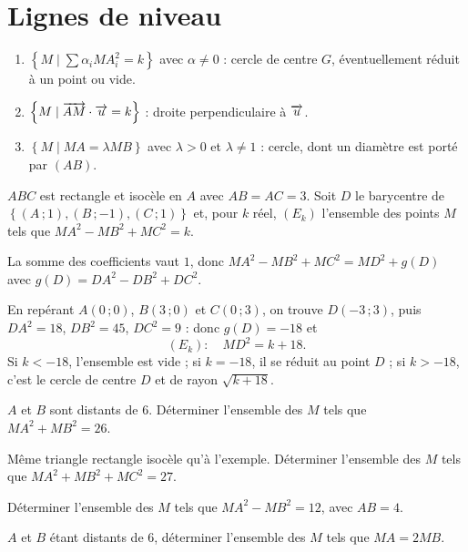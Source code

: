\section{Lignes de niveau}

\begin{propriete}
\begin{enumerate}[label=\textbf{\arabic*.}, leftmargin=*, itemsep=0.15em]
  \item $\left\{M \mid \sum \alpha_{i}MA_{i}^{2} = k\right\}$ avec
        $\alpha \neq 0$ : cercle de centre $G$, éventuellement réduit à un
        point ou vide.
  \item $\left\{M \mid \overrightarrow{AM} \cdot \overrightarrow{u} = k\right\}$ : droite
        perpendiculaire à $\overrightarrow{u}$.
  \item $\left\{M \mid MA = \lambda MB\right\}$ avec $\lambda>0$ et
        $\lambda \neq 1$ : cercle, dont un diamètre est porté par $(AB)$.
\end{enumerate}
\end{propriete}

\begin{exemple}
$ABC$ est rectangle et isocèle en $A$ avec $AB = AC = 3$. Soit $D$ le
barycentre de $\left\{(A\,;1),(B\,;-1),(C\,;1)\right\}$ et, pour $k$ réel,
$(E_{k})$ l'ensemble des points $M$ tels que
$MA^{2}-MB^{2}+MC^{2} = k$.

La somme des coefficients vaut $1$, donc
$MA^{2}-MB^{2}+MC^{2} = MD^{2}+g(D)$ avec
$g(D) = DA^{2}-DB^{2}+DC^{2}$.

En repérant $A(0\,;0)$, $B(3\,;0)$ et $C(0\,;3)$, on trouve $D(-3\,;3)$, puis
$DA^{2} = 18$, $DB^{2} = 45$, $DC^{2} = 9$ : donc $g(D) = -18$ et
\[
  (E_{k}) : \quad MD^{2} = k+18 .
\]
Si $k<-18$, l'ensemble est vide ; si $k = -18$, il se réduit au point $D$ ;
si $k>-18$, c'est le cercle de centre $D$ et de rayon $\sqrt{k+18}$.
\end{exemple}

\begin{entrainement}
\exo[\niveau{1}] $A$ et $B$ sont distants de $6$. Déterminer l'ensemble des
$M$ tels que $MA^{2}+MB^{2} = 26$.

\exo[\niveau{2}] Même triangle rectangle isocèle qu'à l'exemple. Déterminer
l'ensemble des $M$ tels que $MA^{2}+MB^{2}+MC^{2} = 27$.

\exo[\niveau{2}] Déterminer l'ensemble des $M$ tels que
$MA^{2}-MB^{2} = 12$, avec $AB = 4$.

\exo[\niveau{3}] $A$ et $B$ étant distants de $6$, déterminer l'ensemble des
$M$ tels que $MA = 2MB$.
\end{entrainement}

